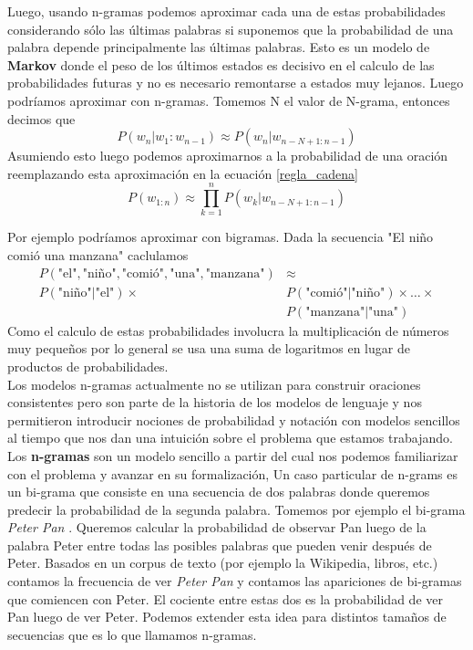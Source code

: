 \documentclass[11pt,a4paper,twoside]{tesis}
\begin{document}
Luego, usando n-gramas podemos aproximar cada una de estas probabilidades considerando sólo las últimas palabras si suponemos que la probabilidad de una palabra depende principalmente las últimas palabras. Esto es un modelo de \textbf{Markov} donde el peso de los últimos estados es decisivo en el calculo de las probabilidades futuras y no es necesario remontarse a estados muy lejanos. Luego podríamos aproximar con n-gramas. Tomemos N el valor de N-grama, entonces decimos que 
$$P(w_n|w_1:w_{n-1}) \approx P(w_n|w_{n-N+1:n-1})$$
Asumiendo esto luego podemos aproximarnos a la probabilidad de una oración reemplazando esta aproximación en la ecuación \eqref{regla_cadena}
$$P(w_{1:n})\approx \prod_{k=1}^n P(w_k|w_{n-N+1:n-1})$$

Por ejemplo podríamos aproximar con bigramas. Dada la secuencia "El niño comió una manzana" caclulamos \begin{equation}
\begin{split}
P(\text{"el"}, \text{"niño"}, \text{"comió"}, \text{"una"}, \text{"manzana"}) & \approx \\
P(\text{"niño"}|\text{"el"}) \times & P(\text{"comió"}|\text{"niño"}) \times \dots \times \\
& P(\text{"manzana"}|\text{"una"})
\end{split}
\end{equation}
Como el calculo de estas probabilidades involucra la multiplicación de números muy pequeños por lo general se usa una suma de logaritmos en lugar de productos de probabilidades. \\

Los modelos n-gramas actualmente no se utilizan para construir oraciones consistentes pero son parte de la historia de los modelos de lenguaje y nos permitieron introducir nociones de probabilidad y notación con modelos sencillos al tiempo que nos dan una intuición sobre el problema que estamos trabajando. \\

Los \textbf{n-gramas} son un modelo sencillo a partir del cual nos podemos familiarizar con el problema y avanzar en su formalización, Un caso particular de n-grams es un bi-grama que consiste en una secuencia de dos palabras donde queremos predecir la probabilidad de la segunda palabra. Tomemos por ejemplo el bi-grama \textit{Peter Pan} . Queremos calcular la probabilidad de observar Pan luego de la palabra Peter entre todas las posibles palabras que pueden venir después de Peter. Basados en un corpus de texto (por ejemplo la Wikipedia, libros, etc.) contamos la frecuencia de ver \textit{Peter Pan} y contamos las apariciones de bi-gramas que comiencen con Peter. El cociente entre estas dos es la probabilidad de ver Pan luego de ver Peter. Podemos extender esta idea para distintos tamaños de secuencias que es lo que llamamos n-gramas.\cite{jurafsky2014speech} \\
\end{document}
